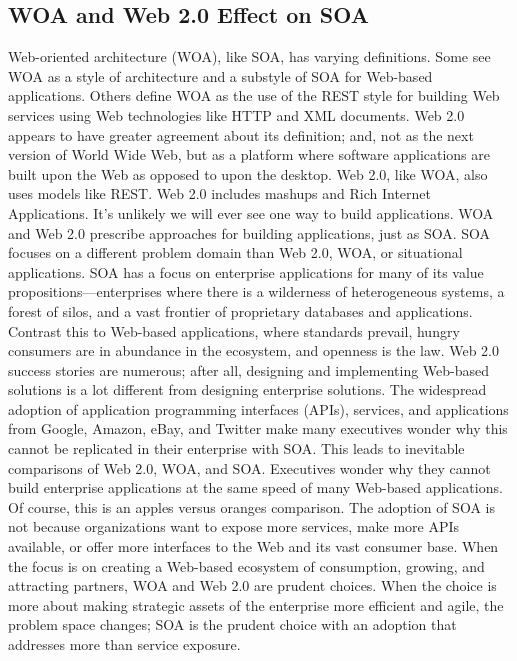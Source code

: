 \documentclass[12pt,a4paper,final,twoside,onecolumn,titlepage]{book}
\begin{document}
\subsection{WOA and Web 2.0 Effect on SOA}
Web-oriented architecture (WOA), like \gls{SOA}, has varying definitions. Some see WOA as a style of architecture and a substyle of \gls{SOA} for Web-based applications. Others define WOA as the use of the REST style for building Web services using Web technologies like \gls{HTTP} and \gls{XML} documents. Web 2.0 appears to have greater agreement about its definition; and, not as the next version of World Wide Web, but as a platform where software applications are built upon the Web as opposed to upon the desktop. Web 2.0, like WOA, also uses models like REST. Web 2.0 includes mashups and Rich Internet Applications. It’s unlikely we will ever see one way to build applications. WOA and Web 2.0 prescribe approaches for building applications, just as \gls{SOA}. \gls{SOA} focuses on a different problem domain than Web 2.0, WOA, or situational applications. \gls{SOA} has a focus on enterprise applications for many of its value propositions—enterprises where there is a wilderness of heterogeneous systems, a forest of silos, and a vast frontier of proprietary databases and applications. Contrast this to Web-based applications, where standards prevail, hungry consumers are in abundance in the ecosystem, and openness is the law.
Web 2.0 success stories are numerous; after all, designing and implementing Web-based solutions is a lot different from designing enterprise solutions. The widespread adoption of application programming interfaces (APIs), services, and applications from Google, Amazon, eBay, and Twitter make many executives wonder why this cannot be replicated in their enterprise with \gls{SOA}. This leads to inevitable comparisons of Web 2.0, WOA, and \gls{SOA}. Executives wonder why they cannot build enterprise applications at the same speed of many Web-based applications. Of course, this is an apples versus oranges comparison. The adoption of \gls{SOA} is not because organizations want to expose more services, make more APIs available, or offer more interfaces to the Web and its vast consumer base. When the focus is on creating a Web-based ecosystem of consumption, growing, and attracting partners, WOA and Web 2.0 are prudent choices. When the choice is more about making strategic assets of the enterprise more efficient and agile, the problem space changes; \gls{SOA} is the prudent choice with an adoption that addresses more than service exposure.
\end{document}
